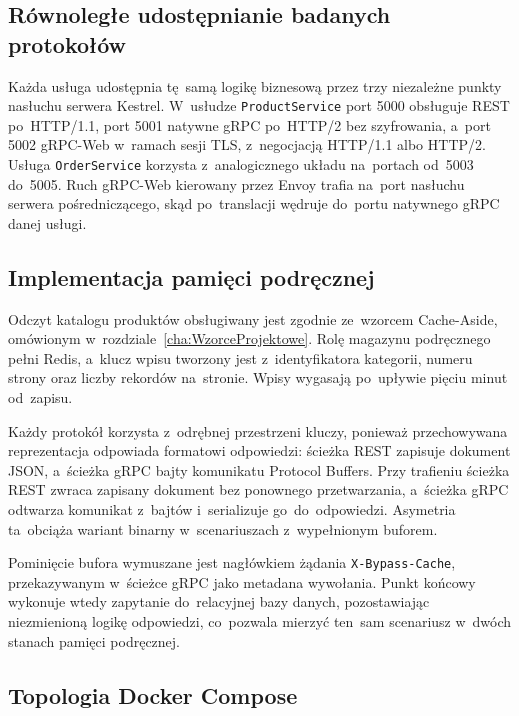 \subsection{Równoległe udostępnianie badanych protokołów}
\label{subsec:TrzyProtokoly}

Każda usługa udostępnia tę~samą logikę biznesową przez trzy niezależne punkty nasłuchu serwera Kestrel. W~usłudze \texttt{ProductService} port 5000 obsługuje REST po~HTTP/1.1, port 5001 natywne gRPC po~HTTP/2 bez szyfrowania, a~port 5002 gRPC-Web w~ramach sesji TLS, z~negocjacją HTTP/1.1 albo HTTP/2. Usługa \texttt{OrderService} korzysta z~analogicznego układu na~portach od~5003 do~5005. Ruch gRPC-Web kierowany przez Envoy trafia na~port nasłuchu serwera pośredniczącego, skąd po~translacji wędruje do~portu natywnego gRPC danej usługi.

\subsection{Implementacja pamięci podręcznej}
\label{subsec:PamiecPodreczna}

Odczyt katalogu produktów obsługiwany jest zgodnie ze~wzorcem Cache-Aside, omówionym w~rozdziale~\ref{cha:WzorceProjektowe}. Rolę magazynu podręcznego pełni Redis, a~klucz wpisu tworzony jest z~identyfikatora kategorii, numeru strony oraz liczby rekordów na~stronie. Wpisy wygasają po~upływie pięciu minut od~zapisu.

Każdy protokół korzysta z~odrębnej przestrzeni kluczy, ponieważ przechowywana reprezentacja odpowiada formatowi odpowiedzi: ścieżka REST zapisuje dokument JSON, a~ścieżka gRPC bajty komunikatu Protocol Buffers. Przy trafieniu ścieżka REST zwraca zapisany dokument bez ponownego przetwarzania, a~ścieżka gRPC odtwarza komunikat z~bajtów i~serializuje go~do~odpowiedzi. Asymetria ta~obciąża wariant binarny w~scenariuszach z~wypełnionym buforem.

Pominięcie bufora wymuszane jest nagłówkiem żądania \texttt{X-Bypass-Cache}, przekazywanym w~ścieżce gRPC jako metadana wywołania. Punkt końcowy wykonuje wtedy zapytanie do~relacyjnej bazy danych, pozostawiając niezmienioną logikę odpowiedzi, co~pozwala mierzyć ten~sam scenariusz w~dwóch stanach pamięci podręcznej.

\subsection{Topologia Docker Compose}
\label{subsec:DockerCompose}

